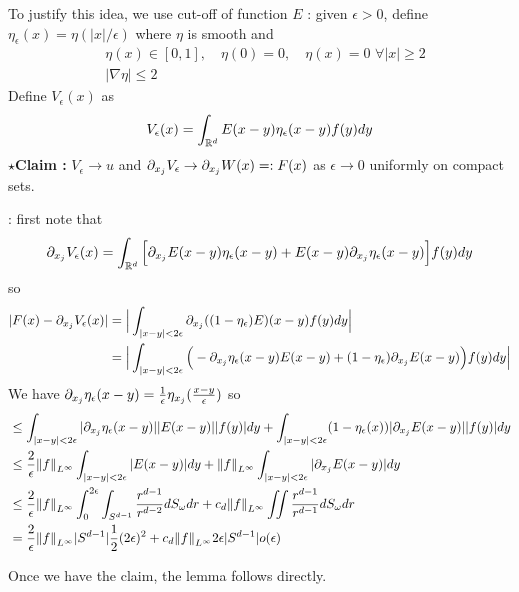 \documentclass[12pt,a4paper]{article}
\newenvironment{proof}
{\begin{changemargin}{0.5cm}{0.5cm} 
	}%
	{\end{changemargin}
}
\newenvironment{subproof}
{\begin{changemargin}{0.5cm}{0.5cm} 
	}%
	{\end{changemargin}
}
\newenvironment{p}
{\begin{proof} 
	}%
	{\end{proof}
}
\begin{document}
\begin{p}
\pf To justify this idea, we use cut-off of function $E$ : given $\epsilon>0$, define $\eta_{\epsilon}(x) = \eta( |x|/ \epsilon)$ where $\eta$ is smooth and
\begin{align*}
& \eta(x) \in [0,1], \quad \eta(0) =0, \quad \eta(x) =0 \,\, \forall |x| \geq 2 \\
& |\nabla \eta| \leq 2
\end{align*}
Define $V_{\epsilon}(x)$ as
\begin{align*}
V_{\epsilon}(x) = \int_{\mathbb{R}^d}  E(x-y) \eta_{\epsilon}(x-y) f(y)dy
\end{align*}
$\star$\textbf{Claim :} $V_{\epsilon} \rightarrow u$ and $\partial_{x_j} V_{\epsilon} \rightarrow \partial_{x_j} W(x) =: F(x)$ as $\epsilon \rightarrow 0$ uniformly on compact sets.
\begin{subproof}
: first note that
\begin{align*}
\partial_{x_j} V_{\epsilon}(x) = \int_{\mathbb{R}^d} \Big[ \partial_{x_j}E(x-y) \eta_{\epsilon}(x-y) + E(x-y) \partial_{x_j}\eta_{\epsilon}(x-y) \Big] f(y) dy
\end{align*}
so
\begin{align*}
|F(x)- \partial_{x_j}V_{\epsilon}(x) | &= \Big| \int_{|x-y| < 2\epsilon} \partial_{x_j}((1-\eta_{\epsilon})E)(x-y) f(y) dy \Big| \\
& = \Big| \int_{|x-y| < 2\epsilon} \Big( -\partial_{x_j} \eta_{\epsilon}(x-y)E(x-y) + (1-\eta_{\epsilon}) \partial_{x_j} E(x-y)\Big)f(y) dy \Big|
\end{align*}
We have $\partial_{x_j} \eta_{\epsilon}(x-y) = \frac{1}{\epsilon} \eta_{x_j}(\frac{x-y}{\epsilon})$ so
\begin{align*}
& \leq \int_{|x-y|< 2\epsilon} |\pa_{x_j} \eta_{\epsilon}(x-y)||E(x-y)||f(y)|dy + \int_{|x-y|<2\epsilon} (1-\eta_{\epsilon}(x)) |\pa_{x_j}E(x-y)| |f(y)|dy \\
& \leq \frac{2}{\epsilon} \snorms{f}{L^{\infty}} \int_{|x-y|< 2\epsilon} |E(x-y)| dy + \snorms{f}{L^{\infty}} \int_{|x-y|< 2\epsilon} |\pa_{x_j} E(x-y)|dy \\
& \leq \frac{2}{\epsilon}\snorms{f}{L^{\infty}} \int_0^{2\epsilon} \int_{S^{d-1}} \frac{r^{d-1}}{r^{d-2}} dS_{\omega} dr + c_d \snorms{f}{L^{\infty}} \iint \frac{r^{d-1}}{r^{d-1}}dS_{\omega} dr \\
& = \frac{2}{\epsilon} \snorms{f}{L^{\infty}} |S^{d-1}| \frac{1}{2}(2\epsilon)^2 + c_d \snorms{f}{L^{\infty}} 2\epsilon |S^{d-1}|  o(\epsilon)
\end{align*}
\end{subproof}
Once we have the claim, the lemma follows directly.

\eop
\end{p}
\s
\end{document}
